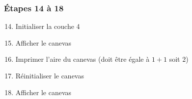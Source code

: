 \documentclass[a11paper, 11pt]{article}
\begin{document}
\subsubsection{Étapes 14 à 18}
\begin{enumerate}
  \setcounter{enumi}{13}
  \item Initialiser la couche 4
  \item Afficher le canevas
  \item Imprimer l'aire du canevas (doit être égale à $1+1$ soit $2$)
  \item Réinitialiser le canevas
  \item Afficher le canevas
\end{enumerate}


\end{document}
